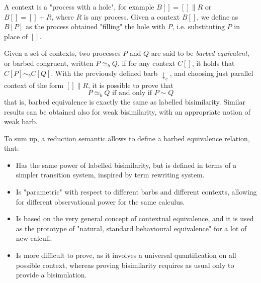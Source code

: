 A context is a "process with a hole", for example $B[] = [] \parallel R$ or $B[] = [] + R$, where $R$ is any process. Given a context $B[]$, we define as $B[P]$ as the process obtained "filling" the hole with $P$, i.e. substituting $P$ in place of $[]$.

Given a set of contexts, two processes $P$ and $Q$ are said to be \textit{barbed equivalent}, or barbed congruent, written $P \simeq_b Q$, if for any context $C[]$, it holds that $C[P] \sim_b C[Q]$. With the previously defined barb $\downarrow_c$, and choosing just parallel context of the form $[] \parallel R$, it is possible to prove that
\[P \simeq_b Q \text{ if and only if } P \sim Q\]
that is, barbed equivalence is exactly the same as labelled bisimilarity. Similar results can be obtained also for weak bisimilarity, with an appropriate notion of weak barb.

To sum up, a reduction semantic allows to define a barbed equivalence relation, that: \begin{itemize}
\item Has the same power of labelled bisimilarity, but is defined in terms of a simpler transition system, inspired by term rewriting system.
\item Is "parametric" with respect to different barbs and different contexts, allowing for different observational power for the same calculus.
\item Is based on the very general concept of contextual equivalence, and it is used as the prototype of "natural, standard behavioural equivalence" for a lot of new calculi.
\item Is more difficult to prove, as it involves a universal quantification on all possible context, whereas proving bisimilarity requires as usual only to provide a bisimulation.
\end{itemize}